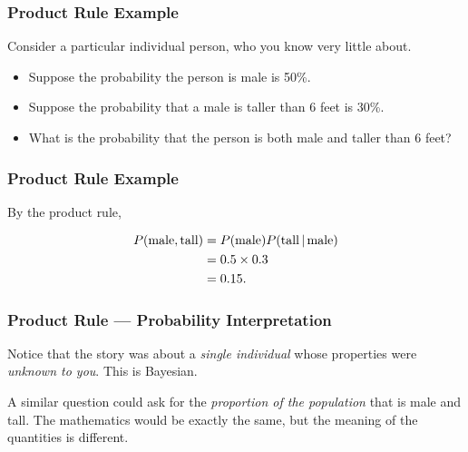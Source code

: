 \documentclass{beamer}
\newcommand{\given}{\,|\,}
\begin{document}
\begin{frame}
\frametitle{Product Rule Example}
Consider a particular individual person, who you know very little about.

\begin{itemize}
\item Suppose the probability the person is male is 50\%.
\item Suppose the probability that a male is taller than 6 feet is
30\%.
\item What is the probability that the person is both male and
taller than 6 feet?
\end{itemize}

\end{frame}

\begin{frame}
\frametitle{Product Rule Example}
By the product rule,

\begin{align}
P(\textnormal{male}, \textnormal{tall})
    &= P(\textnormal{male})P(\textnormal{tall} \given \textnormal{male})\\
    &= 0.5 \times 0.3\\
    &= 0.15.
\end{align}

\end{frame}

\begin{frame}
\frametitle{Product Rule --- Probability Interpretation}
Notice that the story was about a {\em single individual} whose properties
were {\em unknown to you}. This is Bayesian.\\[0.5em]\pause

A similar question could ask for the
{\em proportion of the population} that is male and tall.
The mathematics would be exactly the same, but the meaning of the quantities
is different.
\end{frame}
\end{document}
